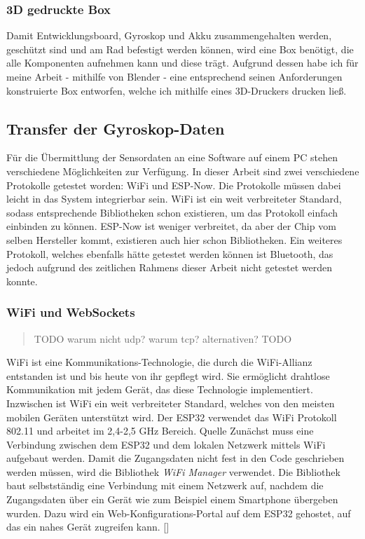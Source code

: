 \hypertarget{d-gedruckte-box}{%
\subsubsection{3D gedruckte Box}\label{d-gedruckte-box}}

Damit Entwicklungsboard, Gyroskop und Akku zusammengehalten werden,
geschützt sind und am Rad befestigt werden können, wird eine Box
benötigt, die alle Komponenten aufnehmen kann und diese trägt. Aufgrund
dessen habe ich für meine Arbeit - mithilfe von Blender - eine
entsprechend seinen Anforderungen konstruierte Box entworfen, welche ich
mithilfe eines 3D-Druckers drucken ließ.

\hypertarget{transfer-der-gyroskop-daten}{%
\subsection{Transfer der
Gyroskop-Daten}\label{transfer-der-gyroskop-daten}}

Für die Übermittlung der Sensordaten an eine Software auf einem PC
stehen verschiedene Möglichkeiten zur Verfügung. In dieser Arbeit sind
zwei verschiedene Protokolle getestet worden: WiFi und ESP-Now. Die
Protokolle müssen dabei leicht in das System integrierbar sein. WiFi ist
ein weit verbreiteter Standard, sodass entsprechende Bibliotheken schon
existieren, um das Protokoll einfach einbinden zu können. ESP-Now ist
weniger verbreitet, da aber der Chip vom selben Hersteller kommt,
existieren auch hier schon Bibliotheken. Ein weiteres Protokoll, welches
ebenfalls hätte getestet werden können ist Bluetooth, das jedoch
aufgrund des zeitlichen Rahmens dieser Arbeit nicht getestet werden
konnte.

\hypertarget{wifi-und-websockets}{%
\subsubsection{WiFi und WebSockets}\label{wifi-und-websockets}}

\begin{quote}
TODO warum nicht udp? warum tcp? alternativen? TODO
\end{quote}

WiFi ist eine Kommunikations-Technologie, die durch die WiFi-Allianz
entstanden ist und bis heute von ihr gepflegt wird. Sie ermöglicht
drahtlose Kommunikation mit jedem Gerät, das diese Technologie
implementiert. Inzwischen ist WiFi ein weit verbreiteter Standard,
welches von den meisten mobilen Geräten unterstützt wird. Der ESP32
verwendet das WiFi Protokoll 802.11 und arbeitet im 2,4-2,5 GHz Bereich.
Quelle Zunächst muss eine Verbindung zwischen dem ESP32 und dem lokalen
Netzwerk mittels WiFi aufgebaut werden. Damit die Zugangsdaten nicht
fest in den Code geschrieben werden müssen, wird die Bibliothek
\emph{WiFi Manager} verwendet. Die Bibliothek baut selbstständig eine
Verbindung mit einem Netzwerk auf, nachdem die Zugangsdaten über ein
Gerät wie zum Beispiel einem Smartphone übergeben wurden. Dazu wird ein
Web-Konfigurations-Portal auf dem ESP32 gehostet, auf das ein nahes
Gerät zugreifen kann. {[}\citep{tzapuWiFiManager2022}{]}

